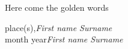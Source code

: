 %
%
%

\preface

Here come the golden words


\vspace{1cm}
\begin{flushright}\noindent
place(s),\hfill {\it First name  Surname}\\
month year\hfill {\it First name  Surname}\\
\end{flushright}



